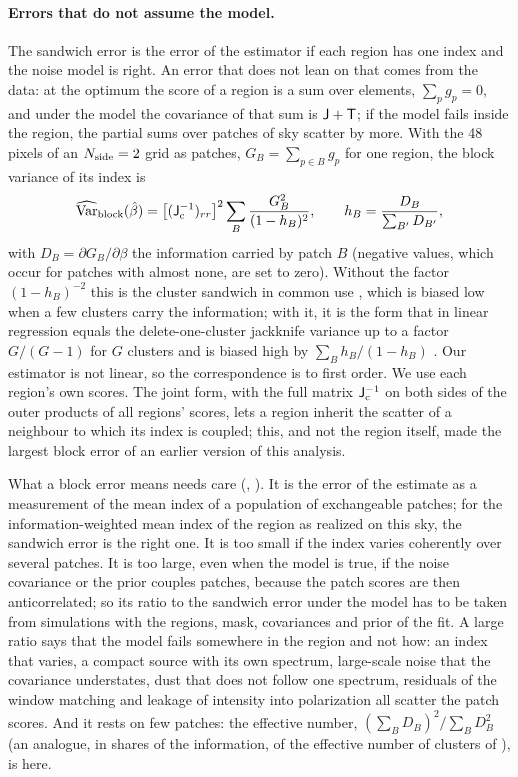 \paragraph{Errors that do not assume the model.} The sandwich error is the error of the estimator if
each region has one index and the noise model is right. An error that does not lean on that comes
from the data: at the optimum the score of a region is a sum over elements, $\sum_p g_p = 0$, and
under the model the covariance of that sum is $\mathsf{J} + \mathsf{T}$; if the model fails inside the region, the
partial sums over patches of sky scatter by more. With the 48 pixels of an $N_{\rm side}=2$ grid as
patches, $G_B = \sum_{p \in B} g_p$ for one region, the block variance of its index is
\begin{equation}
\widehat{\mathrm{Var}}_{\rm block}(\hat\beta) = \big[(\mathsf{J}_{\rm c}^{-1})_{rr}\big]^2
\sum_B \frac{G_B^2}{(1-h_B)^2},
\qquad h_B = \frac{D_B}{\sum_{B'} D_{B'}},
\label{eq:block}
\end{equation}
with $D_B = \partial G_B/\partial\beta$ the information carried by patch $B$ (negative values, which
occur for patches with almost none, are set to zero). Without the factor $(1-h_B)^{-2}$ this is the
cluster sandwich in common use \citep{liang1986}, which is biased low when a few clusters carry the
information; with it, it is the form that in linear regression equals the delete-one-cluster
jackknife variance up to a factor $G/(G-1)$ for $G$ clusters and is biased high by
$\sum_B h_B/(1-h_B)$ \citep{bell2002,cameron2015}. Our estimator is not linear, so the correspondence
is to first order. We use each region's own scores. The joint form, with the full matrix
$\mathsf{J}_{\rm c}^{-1}$ on both sides of the outer products of all regions' scores, lets a region inherit
the scatter of a neighbour to which its index is coupled; this, and not the region itself, made the
largest block error of an earlier version of this analysis.

What a block error means needs care (, ). It
is the error of the estimate as a measurement of the mean index of a population of exchangeable
patches; for the information-weighted mean index of the region as realized on this sky, the sandwich
error is the right one. It is too small if the index varies coherently over several patches. It is
too large, even when the model is true, if the noise covariance or the prior couples patches, because
the patch scores are then anticorrelated; so its ratio to the sandwich error under the model has to
be taken from simulations with the regions, mask, covariances and prior of the fit. A large ratio
says that the model fails somewhere in the region and not how: an index that varies, a compact
source with its own spectrum, large-scale noise that the covariance understates, dust that does not
follow one spectrum, residuals of the window matching and leakage of intensity into polarization all
scatter the patch scores. And it rests on few patches: the effective number,
$(\sum_B D_B)^2/\sum_B D_B^2$ (an analogue, in shares of the information, of the effective number of
clusters of \citealt{carter2017}), is  here.

